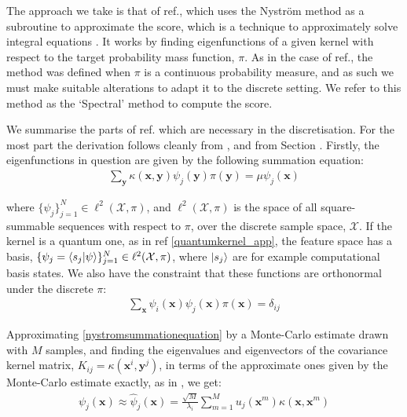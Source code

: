 The approach we take is that of ref., which uses the Nystr{\"o}m method as a subroutine to approximate the score, which is a technique to approximately solve integral equations . It works by finding eigenfunctions of a given kernel with respect to the target probability mass function, $\pi$. As in the case of ref., the method was defined when $\pi$ is a continuous probability measure, and as such we must make suitable alterations to adapt it to the discrete setting. We refer to this method as the `Spectral' method to compute the score. 

We summarise the parts of ref. which are necessary in the discretisation. For the most part the derivation follows cleanly from , and from Section . Firstly, the eigenfunctions in question are given by the following summation equation:
\begin{align}
    \sum_{\mathbf{y}}\kappa(\mathbf{x}, \mathbf{y})\psi_j(\mathbf{y})\pi(\mathbf{y}) = \mu \psi_j(\mathbf{x}) \label{nystromsummationequation}
\end{align}

where $\{\psi_j\}_{j= 1}^N \in \ell^2(\mathcal{X}, \pi)$, and $\ell^2(\mathcal{X}, \pi)$ is the space of all square-summable sequences with respect to $\pi$, over the discrete sample space, $\mathcal{X}$. If the kernel is a quantum one, as in ref \eqref{quantumkernel_app}, the feature space has a basis, $\{\psi_j = \braket{s_j|\psi}\}_{j= 1}^N \in \ell^2(\mathcal{X}, \pi)$, where $\ket{s_j}$ are for example computational basis states. We also have the constraint that these functions are orthonormal under the discrete $\pi$:
\begin{align}
    \sum_{\mathbf{x}}\psi_i(\mathbf{x})\psi_j(\mathbf{x}) \pi(\mathbf{x}) = \delta_{ij} \label{nystromorthomal}
\end{align}


Approximating \eqref{nystromsummationequation} by a Monte-Carlo estimate drawn with $M$ samples, and finding the eigenvalues and eigenvectors of the covariance kernel matrix, $K_{ij} = \kappa(\mathbf{x}^i, \mathbf{y}^j)$, in terms of the approximate ones given by the Monte-Carlo estimate exactly, as in , we get:
\begin{align}
    \psi_j(\mathbf{x}) \approx \hat{\psi}_j(\mathbf{x}) = \frac{\sqrt{M}}{\lambda_i}\sum\limits_{m = 1}^M u_j(\mathbf{x}^m)\kappa(\mathbf{x}, \mathbf{x}^m) \label{nystromeigenfunctions}
\end{align}


